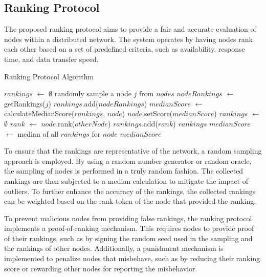 \documentclass[twocolumn]{article}
\begin{document}
\subsection{Ranking Protocol}


The proposed ranking protocol aims to provide a fair and accurate evaluation of nodes within a distributed network. The system operates by having nodes rank each other based on a set of predefined criteria, such as availability, response time, and data transfer speed.


\begin{algorithm}[h]
\caption{Ranking Protocol Algorithm}
\label{alg:ranking-protocol}
\begin{algorithmic}[1]
\State $rankings$ $\gets$ $\emptyset$
    \State randomly sample a node $j$ from $nodes$
    \State $nodeRankings$ $\gets$ getRankings($j$)
    \State $rankings$.add($nodeRankings$)
\EndFor
{}
    \State $medianScore$ $\gets$ calculateMedianScore($rankings$, $node$)
    \State $node$.setScore($medianScore$)
\EndFor
\EndProcedure
{}
\State $rankings$ $\gets$ $\emptyset$
    \State $rank$ $\gets$ $node$.rank($otherNode$)
    \State $rankings$.add($rank$)
\EndFor
\State \Return $rankings$
\EndProcedure
{}
\State $medianScore$ $\gets$ median of all $rankings$ for $node$
\State \Return $medianScore$
\EndProcedure
\end{algorithmic}
\end{algorithm}

To ensure that the rankings are representative of the network, a random sampling approach is employed. By using a random number generator or random oracle, the sampling of nodes is performed in a truly random fashion. The collected rankings are then subjected to a median calculation to mitigate the impact of outliers. To further enhance the accuracy of the rankings, the collected rankings can be weighted based on the rank token of the node that provided the ranking.

To prevent malicious nodes from providing false rankings, the ranking protocol implements a proof-of-ranking mechanism. This requires nodes to provide proof of their rankings, such as by signing the random seed used in the sampling and the rankings of other nodes. Additionally, a punishment mechanism is implemented to penalize nodes that misbehave, such as by reducing their ranking score or rewarding other nodes for reporting the misbehavior.
\end{document}
